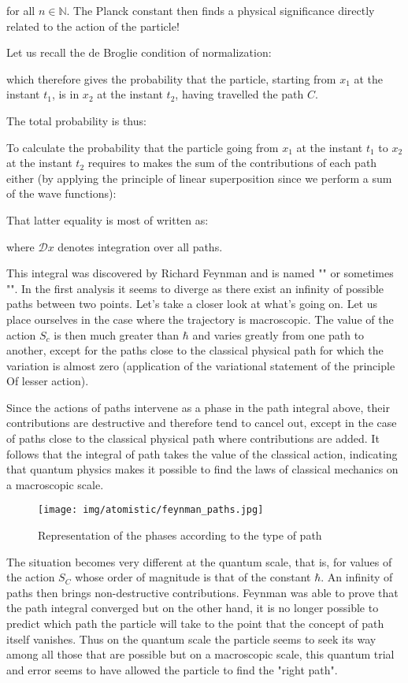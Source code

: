 	for all $n\in\mathbb{N}$. The Planck constant then finds a physical significance directly related to the action of the particle!

	Let us recall the de Broglie condition of normalization:
	
	which therefore gives the probability that the particle, starting from $x_1$ at the instant $t_1$, is in $x_2$ at the instant $t_2$, having travelled the path $C$.

	The total probability is thus:
	
	To calculate the probability that the particle going from $x_1$ at the instant $t_1$ to $x_2$ at the instant $t_2$ requires to makes the sum of the contributions of each path either (by applying the principle of linear superposition since we perform a sum of the wave functions):
	
	That latter equality is most of written as:
	
	where $\mathcal{D}x$ denotes integration over all paths.
	
	This integral was discovered by Richard Feynman and is named "" or sometimes "". In the first analysis it seems to diverge as there exist an infinity of possible paths between two points. Let's take a closer look at what's going on. Let us place ourselves in the case where the trajectory is macroscopic. The value of the action $S_c$ is then much greater than $\hbar$ and varies greatly from one path to another, except for the paths close to the classical physical path for which the variation is almost zero (application of the variational statement of the principle Of lesser action).

	Since the actions of paths intervene as a phase in the path integral above, their contributions are destructive and therefore tend to cancel out, except in the case of paths close to the classical physical path where contributions are added. It follows that the integral of path takes the value of the classical action, indicating that quantum physics makes it possible to find the laws of classical mechanics on a macroscopic scale.
	\begin{figure}[H]
		\centering
		\texttt{[image: img/atomistic/feynman\_paths.jpg]}	
		\caption{Representation of the phases according to the type of path}
	\end{figure}
	The situation becomes very different at the quantum scale, that is, for values of the action $S_C$ whose order of magnitude is that of the constant $\hbar$. An infinity of paths then brings non-destructive contributions. Feynman was able to prove that the path integral converged but on the other hand, it is no longer possible to predict which path the particle will take to the point that the concept of path itself vanishes. Thus on the quantum scale the particle seems to seek its way among all those that are possible but on a macroscopic scale, this quantum trial and error seems to have allowed the particle to find the "right path".

